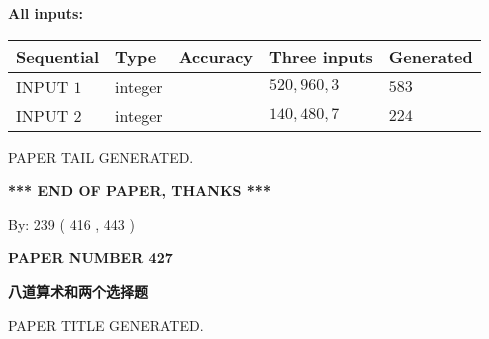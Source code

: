 \documentclass{ctexart}
\begin{document}
   
   
   
\noindent\vspace{0.1in}\hspace{-0.08in} {\textbf{\Large{All inputs: }}}
   
   
  
  
\noindent\begin{tabular}{|l|l|l|l|l|}
\hline
 Sequential & Type & Accuracy & Three inputs & Generated \\ 
\hline
 
 
  INPUT $  1 $ & integer &  & $
 520
 , 
 960
 , 
 3
 $ & $ 583 $ 
 \\  \hline  
 
 
  INPUT $  2 $ & integer &  & $
 140
 , 
 480
 , 
 7
 $ & $ 224 $ 
 \\  \hline  
 \end{tabular}
   
   
   
   
   
   
 \vspace{0.2in}
 
   
   
\vspace{2.0in} PAPER TAIL GENERATED.
   
   
   
   
\vspace{1.0in} 
{\textbf{\large{ *** END OF PAPER, THANKS *** }}} 
   
   
\hspace{1.0in} By: 
 239 ( 416 ,  443 )
   
   
   
   
\newpage 
\setcounter{page}{ 
   427001 } 
   
   
   
   
 {\textbf{ \Large{ PAPER NUMBER  427  }}}
   
   
\vspace{0.2in}
   
   
   
   
   
   
   
   
 \vspace{0.2in}
{\LARGE {\textbf{ 八道算术和两个选择题}}}
   
   
 PAPER TITLE GENERATED.
   
   
   
\vspace{0.2in}
   
\end{document}
